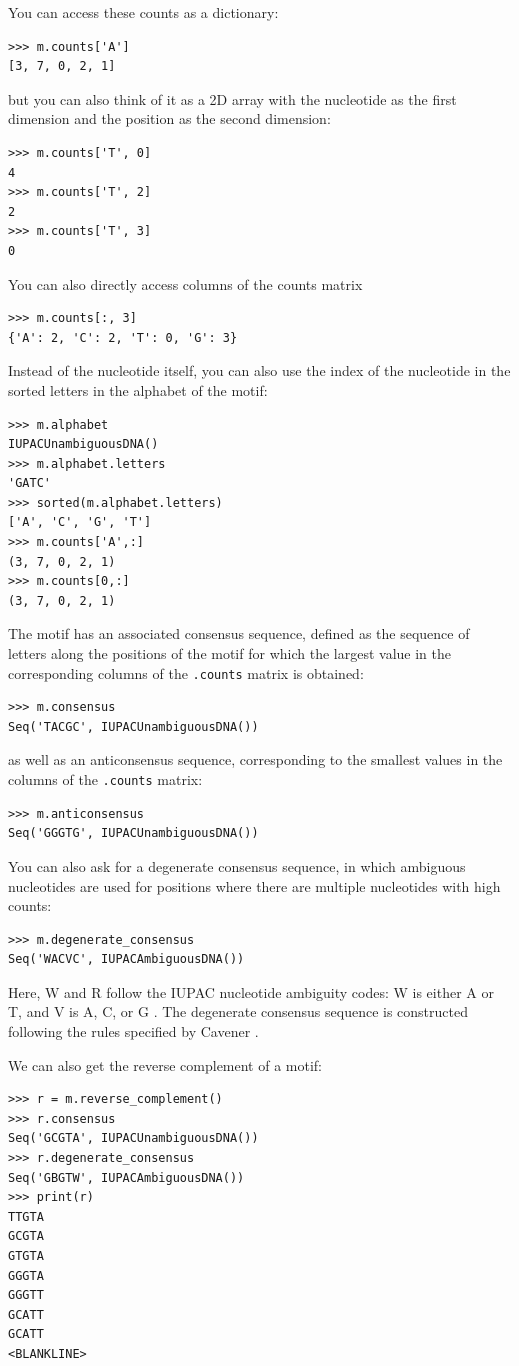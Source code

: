 \documentclass{report}
\begin{document}
You can access these counts as a dictionary:
\begin{verbatim}
>>> m.counts['A']
[3, 7, 0, 2, 1]
\end{verbatim}
but you can also think of it as a 2D array with the nucleotide as the first
dimension and the position as the second dimension:
\begin{verbatim}
>>> m.counts['T', 0]
4
>>> m.counts['T', 2]
2
>>> m.counts['T', 3]
0
\end{verbatim}
You can also directly access columns of the counts matrix
\begin{verbatim}
>>> m.counts[:, 3]
{'A': 2, 'C': 2, 'T': 0, 'G': 3}
\end{verbatim}
Instead of the nucleotide itself, you can also use the index of the nucleotide
in the sorted letters in the alphabet of the motif:
\begin{verbatim}
>>> m.alphabet
IUPACUnambiguousDNA()
>>> m.alphabet.letters
'GATC'
>>> sorted(m.alphabet.letters)
['A', 'C', 'G', 'T']
>>> m.counts['A',:]
(3, 7, 0, 2, 1)
>>> m.counts[0,:]
(3, 7, 0, 2, 1)
\end{verbatim}
The motif has an associated consensus sequence, defined as the sequence of
letters along the positions of the motif for which the largest value in the 
corresponding columns of the \verb+.counts+ matrix is obtained:
\begin{verbatim}
>>> m.consensus
Seq('TACGC', IUPACUnambiguousDNA())
\end{verbatim}
as well as an anticonsensus sequence, corresponding to the smallest values in
the columns of the \verb+.counts+ matrix:
\begin{verbatim}
>>> m.anticonsensus
Seq('GGGTG', IUPACUnambiguousDNA())
\end{verbatim}
You can also ask for a degenerate consensus sequence, in which ambiguous
nucleotides are used for positions where there are multiple nucleotides with
high counts:
\begin{verbatim}
>>> m.degenerate_consensus
Seq('WACVC', IUPACAmbiguousDNA())
\end{verbatim}
Here, W and R follow the IUPAC nucleotide ambiguity codes: W is either A or T,
and V is A, C, or G \cite{cornish1985}. The degenerate consensus sequence is
constructed following the rules specified by Cavener \cite{cavener1987}.

We can also get the reverse complement of a motif:
\begin{verbatim}
>>> r = m.reverse_complement()
>>> r.consensus
Seq('GCGTA', IUPACUnambiguousDNA())
>>> r.degenerate_consensus
Seq('GBGTW', IUPACAmbiguousDNA())
>>> print(r)
TTGTA
GCGTA
GTGTA
GGGTA
GGGTT
GCATT
GCATT
<BLANKLINE>
\end{verbatim}
\end{document}
